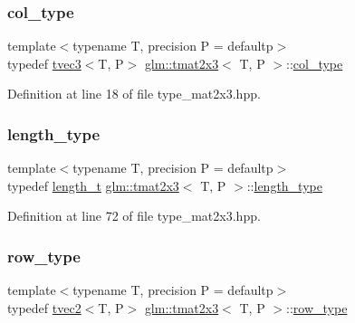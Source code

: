 \subsubsection{\texorpdfstring{col\_type}{col\_type}}
{\footnotesize\ttfamily template$<$typename T, precision P = defaultp$>$ \\
typedef \mbox{\hyperlink{structglm_1_1tvec3}{tvec3}}$<$T, P$>$ \mbox{\hyperlink{structglm_1_1tmat2x3}{glm\+::tmat2x3}}$<$ T, P $>$\+::\mbox{\hyperlink{structglm_1_1tmat2x3_a62523fc3d245c37e15d68c3b9729f366}{col\+\_\+type}}}



Definition at line 18 of file type\+\_\+mat2x3.\+hpp.

\mbox{\label{structglm_1_1tmat2x3_a25be85bf523cf3daa1c2b6b00ad45c82}} 
\subsubsection{\texorpdfstring{length\_type}{length\_type}}
{\footnotesize\ttfamily template$<$typename T, precision P = defaultp$>$ \\
typedef \mbox{\hyperlink{namespaceglm_a090a0de2260835bee80e71a702492ed9}{length\+\_\+t}} \mbox{\hyperlink{structglm_1_1tmat2x3}{glm\+::tmat2x3}}$<$ T, P $>$\+::\mbox{\hyperlink{structglm_1_1tmat2x3_a25be85bf523cf3daa1c2b6b00ad45c82}{length\+\_\+type}}}



Definition at line 72 of file type\+\_\+mat2x3.\+hpp.

\mbox{\label{structglm_1_1tmat2x3_a0cce885b1659b852ff0290413ce02238}} 
\subsubsection{\texorpdfstring{row\_type}{row\_type}}
{\footnotesize\ttfamily template$<$typename T, precision P = defaultp$>$ \\
typedef \mbox{\hyperlink{structglm_1_1tvec2}{tvec2}}$<$T, P$>$ \mbox{\hyperlink{structglm_1_1tmat2x3}{glm\+::tmat2x3}}$<$ T, P $>$\+::\mbox{\hyperlink{structglm_1_1tmat2x3_a0cce885b1659b852ff0290413ce02238}{row\+\_\+type}}}



